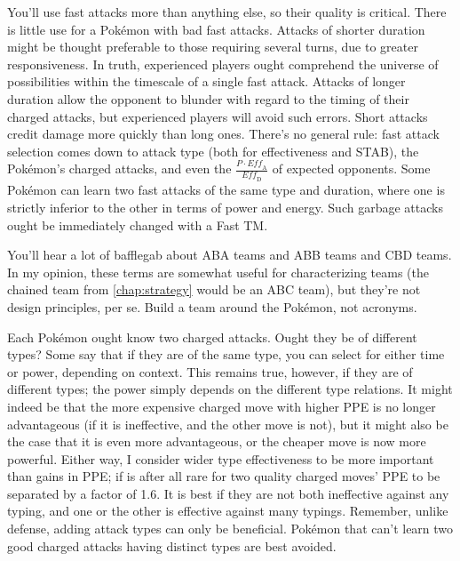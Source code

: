 You'll use fast attacks more than anything else, so their quality is critical.
There is little use for a Pokémon with bad fast attacks.
Attacks of shorter duration might be thought preferable to those requiring
  several turns, due to greater responsiveness.
In truth, experienced players ought comprehend the universe of possibilities
  within the timescale of a single fast attack.
Attacks of longer duration allow the opponent to blunder with regard to the
  timing of their charged attacks, but experienced players will avoid
  such errors.
Short attacks credit damage more quickly than long ones.
There's no general rule: fast attack selection comes down to attack type
  (both for effectiveness and STAB), the Pokémon's charged attacks,
  and even the $\frac{P \cdot \mathit{Eff_\mathrm{A}}}{\mathit{Eff_\mathrm{D}}}$ of expected opponents.
Some Pokémon can learn two fast attacks of the same type and duration,
  where one is strictly inferior to the other in terms of power and
  energy.
Such garbage attacks ought be immediately changed with a Fast TM\@.

\begin{tipbox}[title=Dubwool+Wooloo+Mareep is a BAA team]
You'll hear a lot of bafflegab about ABA teams and ABB teams and CBD teams.
  In my opinion, these terms are somewhat useful for characterizing teams
  (the chained team from \autoref{chap:strategy} would be an ABC team),
  but they're not design principles, per se.
Build a team around the Pokémon, not acronyms.
\end{tipbox}

Each Pokémon ought know two charged attacks.
Ought they be of different types?
Some say that if they are of the same type, you can select for either time or power, depending on context.
This remains true, however, if they are of different types; the power simply depends on
  the different type relations.
It might indeed be that the more expensive charged move with higher PPE is no
  longer advantageous (if it is ineffective, and the other move is not),
  but it might also be the case that it is even more advantageous,
  or the cheaper move is now more powerful.
Either way, I consider wider type effectiveness to be more important than gains in PPE;
  if is after all rare for two quality charged moves' PPE to be separated by a factor of 1.6.
It is best if they are not both ineffective against any typing, and one or the
  other is effective against many typings.
Remember, unlike defense, adding attack types can only be beneficial.
Pokémon that can't learn two good charged attacks having distinct types are best avoided.

